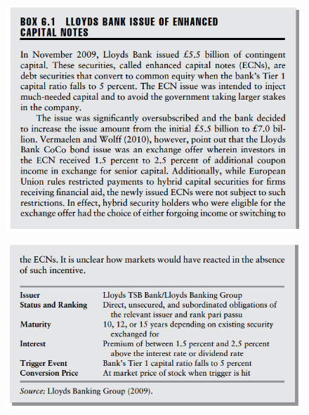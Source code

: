 \documentclass[11pt]{beamer}
\begin{document}
\begin{frame}
\begin{figure}
\includegraphics[width=\textwidth]{6_2.png}
\end{figure}
\end{frame}

\begin{frame}
\begin{figure}
\includegraphics[width=\textwidth]{6_3.png}
\end{figure}
\end{frame}
\end{document}
